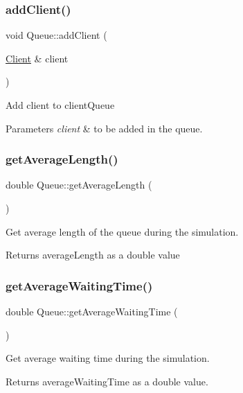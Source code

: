\subsubsection{\texorpdfstring{add\+Client()}{addClient()}}
{\footnotesize\ttfamily void Queue\+::add\+Client (\begin{DoxyParamCaption}\item[{\hyperlink{classClient}{Client} \&}]{client }\end{DoxyParamCaption})}

Add client to client\+Queue 
\begin{DoxyParams}{Parameters}
{\em client} & to be added in the queue. \\
\hline
\end{DoxyParams}
\mbox{\label{classQueue_afc73e60fa330498b5efdbf267d4508c2}} 
\subsubsection{\texorpdfstring{get\+Average\+Length()}{getAverageLength()}}
{\footnotesize\ttfamily double Queue\+::get\+Average\+Length (\begin{DoxyParamCaption}{ }\end{DoxyParamCaption})}

Get average length of the queue during the simulation. \begin{DoxyReturn}{Returns}
average\+Length as a double value 
\end{DoxyReturn}
\mbox{\label{classQueue_a21c1c1c4732177f6b8d8433ae5b4d771}} 
\subsubsection{\texorpdfstring{get\+Average\+Waiting\+Time()}{getAverageWaitingTime()}}
{\footnotesize\ttfamily double Queue\+::get\+Average\+Waiting\+Time (\begin{DoxyParamCaption}{ }\end{DoxyParamCaption})}

Get average waiting time during the simulation. \begin{DoxyReturn}{Returns}
average\+Waiting\+Time as a double value. 
\end{DoxyReturn}
\mbox{\label{classQueue_ac52fd0970c24510a4d0d3086b027021a}} 
